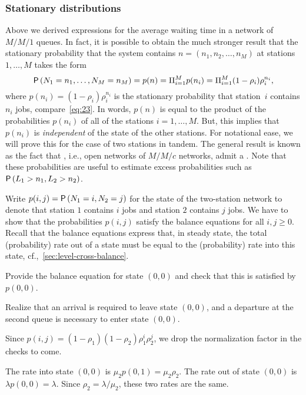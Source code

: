 \subsubsection*{Stationary distributions}

Above we derived expressions for the average waiting time in a network of $M/M/1$ queues.
In fact, it is possible to obtain the much stronger result that the stationary probability that the system contains $n=(n_1,n_2, \ldots, n_M)$ at stations $1,\ldots, M$ takes the form
\begin{equation*}
  \P{N_1=n_1, \ldots, N_M=n_M} = p(n) = \Pi_{i=1}^M p(n_i) = \Pi_{i=1}^M (1-\rho_i)\rho_i^{n_i},
\end{equation*}
where $p(n_i)=(1-\rho_i)\rho_i^{n_i}$ is the stationary probability that station~$i$ contains $n_i$ jobs, compare~\cref{eq:23}.
In words, $p(n)$ is equal to the product of the probabilities $p(n_i)$ of all of the stations $i=1,\ldots,M$.
But, this implies that $p(n_i)$ is \emph{independent} of the state of the other stations.
For notational ease, we will prove this for the case of two stations in tandem.
The general result is known as the fact that , i.e., open networks of $M/M/c$ networks, admit a .
Note that these probabilities are useful to estimate excess probabilities such as $\P{L_1> n_1, L_2>n_2}$. 


Write $p(i,j)=\P{N_1=i, N_2=j}$ for the state of the two-station network to denote that station $1$ contains $i$ jobs and station $2$ contains $j$ jobs.
We have to show that the probabilities $p(i,j)$ satisfy the balance equations for all $i, j\geq 0$.
Recall that the balance equations express that, in steady state, the total (probability) rate out of a state must be equal to the (probability) rate into this state, cf.,~\cref{sec:level-cross-balance}.

\begin{extra}
  Provide the balance equation for state $(0,0)$ and check that this is satisfied by $p(0,0)$.
\begin{hint}
  Realize that an arrival is required to leave state $(0,0)$, and a departure at the second queue is necessary to enter state $(0,0)$.
\end{hint}
\begin{solution}
  Since $p(i,j) = (1-\rho_1)(1-\rho_2)\rho_1^i \rho_2^j$, we drop the normalization factor in the checks to come.

  The rate into state $(0,0)$ is $\mu_2 p(0,1) = \mu_2 \rho_2$. The rate out of state $(0,0)$ is $\lambda p(0,0) = \lambda$. Since $\rho_2=\lambda/\mu_2$, these two rates are the same.
\end{solution}
\end{extra}

